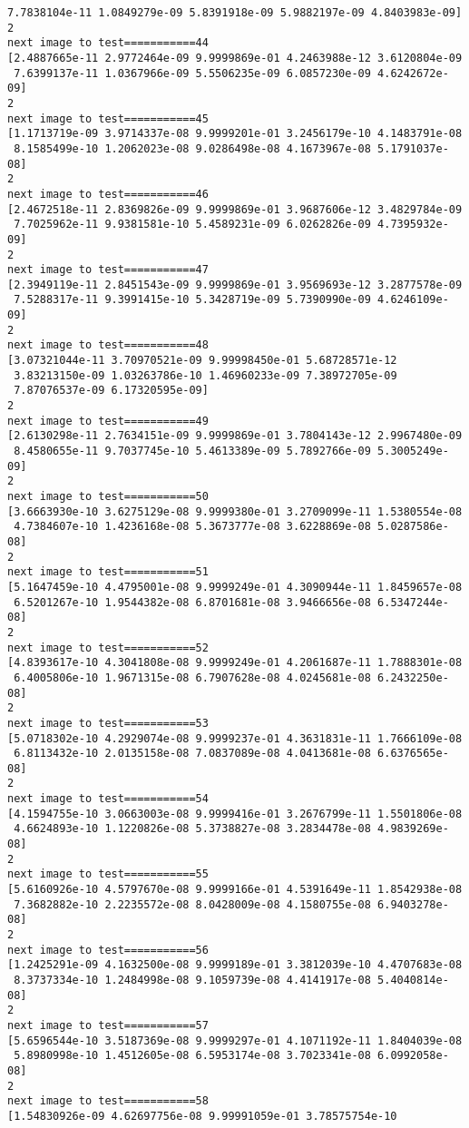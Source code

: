 \documentclass[11pt]{article}
\begin{document}
\begin{Verbatim}[commandchars=\\\{\}]
 7.7838104e-11 1.0849279e-09 5.8391918e-09 5.9882197e-09 4.8403983e-09]
2
next image to test===========44
[2.4887665e-11 2.9772464e-09 9.9999869e-01 4.2463988e-12 3.6120804e-09
 7.6399137e-11 1.0367966e-09 5.5506235e-09 6.0857230e-09 4.6242672e-09]
2
next image to test===========45
[1.1713719e-09 3.9714337e-08 9.9999201e-01 3.2456179e-10 4.1483791e-08
 8.1585499e-10 1.2062023e-08 9.0286498e-08 4.1673967e-08 5.1791037e-08]
2
next image to test===========46
[2.4672518e-11 2.8369826e-09 9.9999869e-01 3.9687606e-12 3.4829784e-09
 7.7025962e-11 9.9381581e-10 5.4589231e-09 6.0262826e-09 4.7395932e-09]
2
next image to test===========47
[2.3949119e-11 2.8451543e-09 9.9999869e-01 3.9569693e-12 3.2877578e-09
 7.5288317e-11 9.3991415e-10 5.3428719e-09 5.7390990e-09 4.6246109e-09]
2
next image to test===========48
[3.07321044e-11 3.70970521e-09 9.99998450e-01 5.68728571e-12
 3.83213150e-09 1.03263786e-10 1.46960233e-09 7.38972705e-09
 7.87076537e-09 6.17320595e-09]
2
next image to test===========49
[2.6130298e-11 2.7634151e-09 9.9999869e-01 3.7804143e-12 2.9967480e-09
 8.4580655e-11 9.7037745e-10 5.4613389e-09 5.7892766e-09 5.3005249e-09]
2
next image to test===========50
[3.6663930e-10 3.6275129e-08 9.9999380e-01 3.2709099e-11 1.5380554e-08
 4.7384607e-10 1.4236168e-08 5.3673777e-08 3.6228869e-08 5.0287586e-08]
2
next image to test===========51
[5.1647459e-10 4.4795001e-08 9.9999249e-01 4.3090944e-11 1.8459657e-08
 6.5201267e-10 1.9544382e-08 6.8701681e-08 3.9466656e-08 6.5347244e-08]
2
next image to test===========52
[4.8393617e-10 4.3041808e-08 9.9999249e-01 4.2061687e-11 1.7888301e-08
 6.4005806e-10 1.9671315e-08 6.7907628e-08 4.0245681e-08 6.2432250e-08]
2
next image to test===========53
[5.0718302e-10 4.2929074e-08 9.9999237e-01 4.3631831e-11 1.7666109e-08
 6.8113432e-10 2.0135158e-08 7.0837089e-08 4.0413681e-08 6.6376565e-08]
2
next image to test===========54
[4.1594755e-10 3.0663003e-08 9.9999416e-01 3.2676799e-11 1.5501806e-08
 4.6624893e-10 1.1220826e-08 5.3738827e-08 3.2834478e-08 4.9839269e-08]
2
next image to test===========55
[5.6160926e-10 4.5797670e-08 9.9999166e-01 4.5391649e-11 1.8542938e-08
 7.3682882e-10 2.2235572e-08 8.0428009e-08 4.1580755e-08 6.9403278e-08]
2
next image to test===========56
[1.2425291e-09 4.1632500e-08 9.9999189e-01 3.3812039e-10 4.4707683e-08
 8.3737334e-10 1.2484998e-08 9.1059739e-08 4.4141917e-08 5.4040814e-08]
2
next image to test===========57
[5.6596544e-10 3.5187369e-08 9.9999297e-01 4.1071192e-11 1.8404039e-08
 5.8980998e-10 1.4512605e-08 6.5953174e-08 3.7023341e-08 6.0992058e-08]
2
next image to test===========58
[1.54830926e-09 4.62697756e-08 9.99991059e-01 3.78575754e-10

\end{Verbatim}
\end{document}
